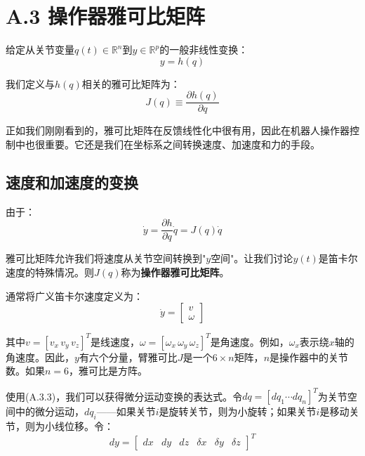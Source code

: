 \documentclass[UTF8,a4paper]{ctexart}
\begin{document}
\section{A.3 操作器雅可比矩阵}

给定从关节变量$q(t) \in \mathbb{R}^n$到$y \in \mathbb{R}^p$的一般非线性变换：
\begin{equation}
y = h(q)
\tag{A.3.1}
\end{equation}

我们定义与$h(q)$相关的雅可比矩阵为：
\begin{equation}
J(q) \equiv \frac{\partial h(q)}{\partial q}
\tag{A.3.2}
\end{equation}

正如我们刚刚看到的，雅可比矩阵在反馈线性化中很有用，因此在机器人操作器控制中也很重要。它还是我们在坐标系之间转换速度、加速度和力的手段。

\subsection{速度和加速度的变换}

由于：
\begin{equation}
\dot{y} = \frac{\partial h}{\partial q}\dot{q} = J(q)\dot{q}
\tag{A.3.3}
\end{equation}

雅可比矩阵允许我们将速度从关节空间转换到"$y$空间"。让我们讨论$y(t)$是笛卡尔速度的特殊情况。则$J(q)$称为\textbf{操作器雅可比矩阵}。

通常将广义笛卡尔速度定义为：
\begin{equation}
\dot{y} = \begin{bmatrix} v \\ \omega \end{bmatrix}
\tag{A.3.4}
\end{equation}

其中$v = [v_x \, v_y \, v_z]^T$是线速度，$\omega = [\omega_x \, \omega_y \, \omega_z]^T$是角速度。例如，$\omega_x$表示绕$x$轴的角速度。因此，$y$有六个分量，臂雅可比$J$是一个$6 \times n$矩阵，$n$是操作器中的关节数。如果$n=6$，雅可比是方阵。

使用(A.3.3)，我们可以获得微分运动变换的表达式。令$dq = [dq_1 \cdots dq_n]^T$为关节空间中的微分运动，$dq_i$——如果关节$i$是旋转关节，则为小旋转；如果关节$i$是移动关节，则为小线位移。令：
\begin{equation}
dy = \begin{bmatrix} dx & dy & dz & \delta x & \delta y & \delta z \end{bmatrix}^T
\tag{A.3.5}
\end{equation}
\end{document}
